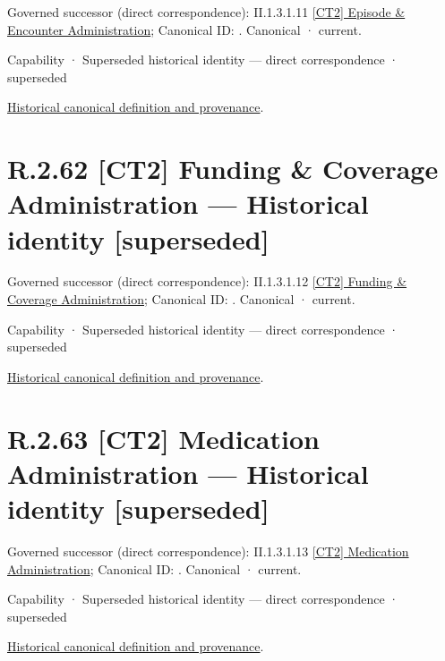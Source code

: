 {\small Governed successor (direct correspondence): II.1.3.1.11 \hyperref[element:61d7067aee0540259b3daca4287d66d2]{[CT2] Episode \& Encounter Administration}; Canonical ID: \texttt{}. Canonical · current.}\par
\label{element:2778f988e8d44e3091749542c39d38a4}
{\small Capability · Superseded historical identity — direct correspondence · superseded}\par
\href{../../../../continuum/strategy/capability/2778f988e8d44e3091749542c39d38a4.md}{Historical canonical definition and provenance}.\par
\section*{R.2.62 [CT2] Funding \& Coverage Administration — Historical identity [superseded]}
\label{navigation:R.2.62}

{\small Governed successor (direct correspondence): II.1.3.1.12 \hyperref[element:640432d413cf47928ea2b3d221f92313]{[CT2] Funding \& Coverage Administration}; Canonical ID: \texttt{}. Canonical · current.}\par
\label{element:58beafcbcd084331be710eb00d27f6cf}
{\small Capability · Superseded historical identity — direct correspondence · superseded}\par
\href{../../../../continuum/strategy/capability/58beafcbcd084331be710eb00d27f6cf.md}{Historical canonical definition and provenance}.\par
\section*{R.2.63 [CT2] Medication Administration — Historical identity [superseded]}
\label{navigation:R.2.63}

{\small Governed successor (direct correspondence): II.1.3.1.13 \hyperref[element:c907e2a95629435b9951941ad4e2ebe9]{[CT2] Medication Administration}; Canonical ID: \texttt{}. Canonical · current.}\par
\label{element:5a38bf2527a8404bac714121f2dc76a9}
{\small Capability · Superseded historical identity — direct correspondence · superseded}\par
\href{../../../../continuum/strategy/capability/5a38bf2527a8404bac714121f2dc76a9.md}{Historical canonical definition and provenance}.\par
